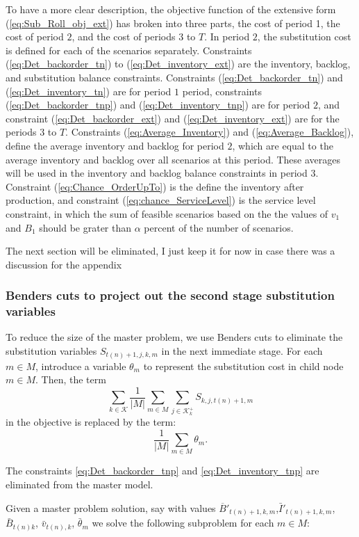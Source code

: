 \documentclass[10pt]{article}
\newcommand{\ti}{t} %
\newcommand{\Ti}{T}
\newcommand{\ka}{k} %
\newcommand{\KA}{\mathcal{K}}
\newcommand{\jey}{j} %
\newcommand{\Vi}{v} %
\newcommand{\Csub}{\mathcal{K}^+_k}
\newcommand{\cred}{\color{red!65!black}}
\begin{document}
 To have a more clear description, the objective function of the extensive form (\ref{eq:Sub_Roll_obj_ext}) has broken into three parts, the cost of period 1, the cost of period $2$, and the cost of periods $3$ to $\Ti$. In period $2$, the substitution cost is defined for each of the scenarios separately. Constraints (\ref{eq:Det_backorder_tn}) to (\ref{eq:Det_inventory_ext}) are the inventory, backlog, and substitution balance constraints. Constraints (\ref{eq:Det_backorder_tn}) and (\ref{eq:Det_inventory_tn}) are for period $1$ period, constraints (\ref{eq:Det_backorder_tnp}) and (\ref{eq:Det_inventory_tnp}) are for period $2$, and constraint (\ref{eq:Det_backorder_ext}) and (\ref{eq:Det_inventory_ext}) are for the periods $3$ to $\Ti$. Constraints (\ref{eq:Average_Inventory}) and (\ref{eq:Average_Backlog}), define the average inventory and backlog for period $2$, which are equal to the average inventory and backlog over all scenarios at this period. These averages will be used in the inventory and backlog balance constraints in period $3$. Constraint (\ref{eq:Chance_OrderUpTo}) is the define the inventory after production, and constraint (\ref{eq:chance_ServiceLevel}) is the service level constraint, in which the sum of feasible scenarios based on the the values of $\Vi_1$ and $B_1$ should be grater than $\alpha$ percent of the number of scenarios.\\


    
 
 {\cred
\large{The next section will be eliminated, I just keep it for now in case there was a discussion for the appendix}

  \subsubsection{Benders cuts to project out the second stage substitution variables}
  
  
 To reduce the size of the master problem, we use Benders cuts to eliminate the substitution variables $S_{\ti(n)+1,\jey,\ka,m}$ in the next immediate stage. For each $m \in M$, introduce a variable $\theta_m$ to represent the substitution cost in child node $m \in M$. Then, the term 
 \[ \sum_{\ka \in \KA} \frac{1}{|M|} \sum_{m \in M} \sum_{\jey \in  \Csub} S_{k,j,\ti(n)+1,m} \]
 in the objective is replaced by the term:
 \[ \frac{1}{|M|} \sum_{m \in M} \theta_m. \]

The constraints \eqref{eq:Det_backorder_tnp} and \eqref{eq:Det_inventory_tnp} are eliminated from the master model. 

Given a master problem solution, say with values $\overline{B}'_{\ti(n)+1 , \ka,m}$,$\bar{I}'_{\ti(n)+1 , \ka,m}$,$\bar{B}_{ \ti(n) \ka}$, $\bar{v}_{\ti(n) , \ka}$, $\bar{\theta}_m$ we solve the following subproblem for each $m \in M$:

}
\end{document}
